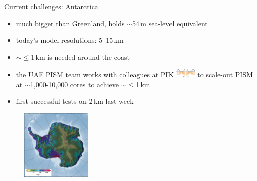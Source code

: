 \documentclass[hide notes,intlimits]{beamer}
\begin{document}
\begin{frame}{Current challenges: Antarctica}

    \begin{itemize}
    \item much bigger than Greenland, holds $\sim$54\,m sea-level equivalent
    \item today's model resolutions: 5--15\,km
    \item $\sim\le$1\,km is needed around the coast
    \item the UAF PISM team works with colleagues at PIK \includegraphics[width=1cm]{Logo_Pik_klein} to scale-out PISM at $\sim$1,000-10,000 cores to achieve  $\sim\le$1\,km
    \item first successful tests on 2\,km last week
    \end{itemize}

\begin{figure}
    \includegraphics[width=0.3\textwidth]{antartica-speed-exp-5km}
\end{figure}
\end{frame}
\end{document}
